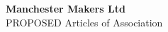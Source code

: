 

\begin{titlepage}
\begin{center}
{\bf \LARGE Manchester Makers Ltd}\\[36pt]
{\Large PROPOSED Articles of Association}

\vfill

\end{center}
\end{titlepage}


